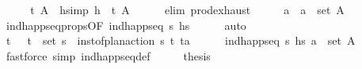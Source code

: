 \begin{isabellebody}
\ \ \isamarkupfalse%
\ \isamarkupfalse%
\ t\ A\ \ h{\isacharbrackleft}{\kern0pt}simp{\isacharbrackright}{\kern0pt}{\isacharcolon}{\kern0pt}\ {\isachardoublequoteopen}h\ {\isacharequal}{\kern0pt}\ {\isacharparenleft}{\kern0pt}t{\isacharcomma}{\kern0pt}\ A{\isacharparenright}{\kern0pt}{\isachardoublequoteclose}\isanewline
\ \ \ \ \isamarkupfalse%
\ {\isacharparenleft}{\kern0pt}elim\ prod{\isachardot}{\kern0pt}exhaust{\isacharparenright}{\kern0pt}\isanewline
\ \ \isamarkupfalse%
\ \isamarkupfalse%
\ a\ \ {\isachardoublequoteopen}a\ {\isasymin}\ set\ A{\isachardoublequoteclose}\isanewline
\ \ \ \ \isamarkupfalse%
\ ind{\isacharunderscore}{\kern0pt}happ{\isacharunderscore}{\kern0pt}seq{\isacharunderscore}{\kern0pt}props{\isacharparenleft}{\kern0pt}{}{\isacharparenright}{\kern0pt}{\isacharbrackleft}{\kern0pt}OF\ {\isacartoucheopen}ind{\isacharunderscore}{\kern0pt}happ{\isacharunderscore}{\kern0pt}seq\ {\isasympi}s\ hs{\isacartoucheclose}{\isacharbrackright}{\kern0pt}\isanewline
\ \ \ \ \isamarkupfalse%
\ auto\isanewline
\ \ \isamarkupfalse%
\ \isamarkupfalse%
\ t\isactrlsub {\isasympi}\ {\isasympi}\ \ {\isachardoublequoteopen}{\isacharparenleft}{\kern0pt}t\isactrlsub {\isasympi}{\isacharcomma}{\kern0pt}{\isasympi}{\isacharparenright}{\kern0pt}\ {\isasymin}\ set\ {\isasympi}s{\isachardoublequoteclose}\ \ {\isachardoublequoteopen}inst{\isacharunderscore}{\kern0pt}of{\isacharunderscore}{\kern0pt}plan{\isacharunderscore}{\kern0pt}action\ {\isasympi}s\ {\isacharparenleft}{\kern0pt}t\isactrlsub {\isasympi}{\isacharcomma}{\kern0pt}{\isasympi}{\isacharparenright}{\kern0pt}\ {\isacharparenleft}{\kern0pt}t{\isacharcomma}{\kern0pt}a{\isacharparenright}{\kern0pt}{\isachardoublequoteclose}\isanewline
\ \ \ \ \isamarkupfalse%
\ {\isacartoucheopen}ind{\isacharunderscore}{\kern0pt}happ{\isacharunderscore}{\kern0pt}seq\ {\isasympi}s\ hs{\isacartoucheclose}\ {\isacartoucheopen}a\ {\isasymin}\ set\ A{\isacartoucheclose}\isanewline
\ \ \ \ \isamarkupfalse%
\ {\isacharparenleft}{\kern0pt}fastforce\ simp{\isacharcolon}{\kern0pt}\ ind{\isacharunderscore}{\kern0pt}happ{\isacharunderscore}{\kern0pt}seq{\isacharunderscore}{\kern0pt}def{\isacharparenright}{\kern0pt}\isanewline
\ \ \isamarkupfalse%
\ \isamarkupfalse%
\ {\isacharquery}{\kern0pt}thesis\isanewline

\end{isabellebody}
